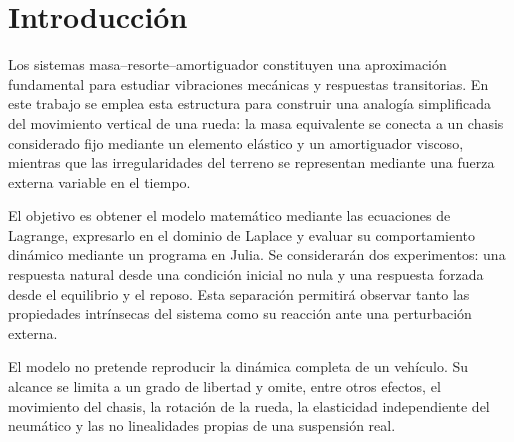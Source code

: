 \section{Introducción}

Los sistemas masa--resorte--amortiguador constituyen una aproximación fundamental para estudiar vibraciones mecánicas y respuestas transitorias. En este trabajo se emplea esta estructura para construir una analogía simplificada del movimiento vertical de una rueda: la masa equivalente se conecta a un chasis considerado fijo mediante un elemento elástico y un amortiguador viscoso, mientras que las irregularidades del terreno se representan mediante una fuerza externa variable en el tiempo.

El objetivo es obtener el modelo matemático mediante las ecuaciones de Lagrange, expresarlo en el dominio de Laplace y evaluar su comportamiento dinámico mediante un programa en Julia. Se considerarán dos experimentos: una respuesta natural desde una condición inicial no nula y una respuesta forzada desde el equilibrio y el reposo. Esta separación permitirá observar tanto las propiedades intrínsecas del sistema como su reacción ante una perturbación externa.

El modelo no pretende reproducir la dinámica completa de un vehículo. Su alcance se limita a un grado de libertad y omite, entre otros efectos, el movimiento del chasis, la rotación de la rueda, la elasticidad independiente del neumático y las no linealidades propias de una suspensión real.
